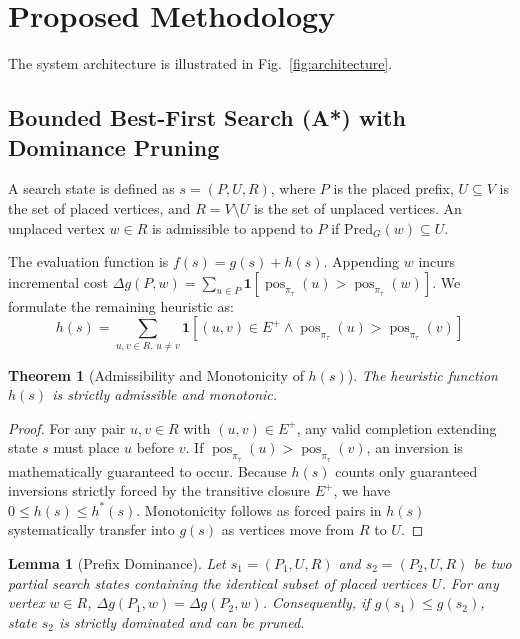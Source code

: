 \documentclass[journal]{IEEEtran}
\DeclareMathOperator{\pos}{pos}
\newtheorem{theorem}{Theorem}
\newtheorem{lemma}{Lemma}
\begin{document}
\section{Proposed Methodology}
\label{sec:methodology}

The system architecture is illustrated in Fig.~\ref{fig:architecture}.

\subsection{Bounded Best-First Search (A*) with Dominance Pruning}
A search state is defined as $s = (P, U, R)$, where $P$ is the placed prefix, $U \subseteq V$ is the set of placed vertices, and $R = V \setminus U$ is the set of unplaced vertices. An unplaced vertex $w \in R$ is admissible to append to $P$ if $\text{Pred}_G(w) \subseteq U$.

The evaluation function is $f(s) = g(s) + h(s)$. Appending $w$ incurs incremental cost $\Delta g(P, w) = \sum_{u \in P} \mathbf{1}\left[ \pos_{\pi_\tau}(u) > \pos_{\pi_\tau}(w) \right]$.
We formulate the remaining heuristic as:
\begin{equation}
h(s) = \sum_{u, v \in R, \, u \neq v} \mathbf{1}\left[ (u, v) \in E^+ \land \pos_{\pi_\tau}(u) > \pos_{\pi_\tau}(v) \right]
\end{equation}

\begin{theorem}[Admissibility and Monotonicity of $h(s)$]
The heuristic function $h(s)$ is strictly admissible and monotonic.
\end{theorem}

\begin{proof}
For any pair $u, v \in R$ with $(u, v) \in E^+$, any valid completion extending state $s$ must place $u$ before $v$. If $\pos_{\pi_\tau}(u) > \pos_{\pi_\tau}(v)$, an inversion is mathematically guaranteed to occur. Because $h(s)$ counts only guaranteed inversions strictly forced by the transitive closure $E^+$, we have $0 \le h(s) \le h^*(s)$. Monotonicity follows as forced pairs in $h(s)$ systematically transfer into $g(s)$ as vertices move from $R$ to $U$.
\end{proof}

\begin{lemma}[Prefix Dominance]
Let $s_1 = (P_1, U, R)$ and $s_2 = (P_2, U, R)$ be two partial search states containing the identical subset of placed vertices $U$. For any vertex $w \in R$, $\Delta g(P_1, w) = \Delta g(P_2, w)$. Consequently, if $g(s_1) \le g(s_2)$, state $s_2$ is strictly dominated and can be pruned.
\end{lemma}
\end{document}
